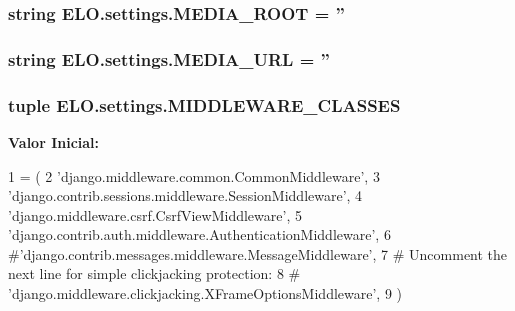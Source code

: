\hypertarget{namespaceELO_1_1settings_a1f618eef9196cda0088f532a66ec0648}{
\subsubsection[{M\-E\-D\-I\-A\-\_\-\-R\-O\-O\-T}]{\setlength{\rightskip}{0pt plus 5cm}string E\-L\-O.\-settings.\-M\-E\-D\-I\-A\-\_\-\-R\-O\-O\-T = ''}}\label{df/d5b/namespaceELO_1_1settings_a1f618eef9196cda0088f532a66ec0648}
\hypertarget{namespaceELO_1_1settings_acd3e1c3559f7c87f5aad004b76458ddc}{
\subsubsection[{M\-E\-D\-I\-A\-\_\-\-U\-R\-L}]{\setlength{\rightskip}{0pt plus 5cm}string E\-L\-O.\-settings.\-M\-E\-D\-I\-A\-\_\-\-U\-R\-L = ''}}\label{df/d5b/namespaceELO_1_1settings_acd3e1c3559f7c87f5aad004b76458ddc}
\hypertarget{namespaceELO_1_1settings_a968380d6242dca6cc82acb1d806c703d}{
\subsubsection[{M\-I\-D\-D\-L\-E\-W\-A\-R\-E\-\_\-\-C\-L\-A\-S\-S\-E\-S}]{\setlength{\rightskip}{0pt plus 5cm}tuple E\-L\-O.\-settings.\-M\-I\-D\-D\-L\-E\-W\-A\-R\-E\-\_\-\-C\-L\-A\-S\-S\-E\-S}}\label{df/d5b/namespaceELO_1_1settings_a968380d6242dca6cc82acb1d806c703d}
{\bfseries Valor Inicial\-:}
\begin{DoxyCode}
1 = (
2     \textcolor{stringliteral}{'django.middleware.common.CommonMiddleware'},
3     \textcolor{stringliteral}{'django.contrib.sessions.middleware.SessionMiddleware'},
4     \textcolor{stringliteral}{'django.middleware.csrf.CsrfViewMiddleware'},
5     \textcolor{stringliteral}{'django.contrib.auth.middleware.AuthenticationMiddleware'},
6     \textcolor{comment}{#'django.contrib.messages.middleware.MessageMiddleware',}
7     \textcolor{comment}{# Uncomment the next line for simple clickjacking protection:}
8     \textcolor{comment}{# 'django.middleware.clickjacking.XFrameOptionsMiddleware',}
9 )
\end{DoxyCode}
